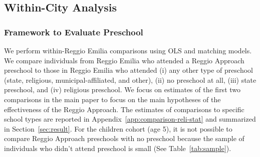 \subsection{Within-City Analysis} \label{sec:within-city-analysis}

\subsubsection{Framework to Evaluate Preschool}
\label{subsubsection:OLS-Preschool}

We perform within-Reggio Emilia comparisons using OLS and matching models. We compare individuals from Reggio Emilia who attended a Reggio Approach preschool to those in Reggio Emilia who attended (i) any other type of preschool (state, religious, municipal-affiliated, and other), (ii) no preschool at all, (iii) state preschool, and (iv) religious preschool. We focus on estimates of the first two comparisons in the main paper to focus on the main hypotheses of the effectiveness of the Reggio Approach. The estimates of comparisons to specific school types are reported in Appendix~\ref{app:comparison-reli-stat} and summarized in Section~\ref{sec:result}. For the children cohort (age 5), it is not possible to compare Reggio Approach preschools with no preschool because the sample of individuals who didn't attend preschool is small (See Table~\ref{tab:sample}).

